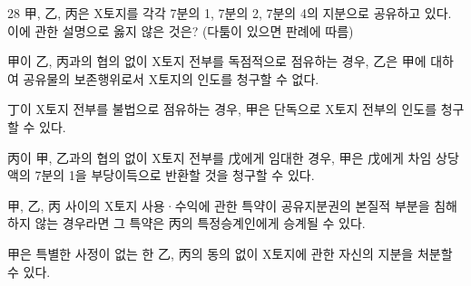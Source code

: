 \begin{question}{28}
甲, 乙, 丙은 X토지를 각각 7분의 1, 7분의 2, 7분의 4의 지분으로 공유하고 있다. 이에 관한 설명으로 옳지 않은 것은? (다툼이 있으면 판례에 따름)
\begin{choices}
  \item 甲이 乙, 丙과의 협의 없이 X토지 전부를 독점적으로 점유하는 경우, 乙은 甲에 대하여 공유물의 보존행위로서 X토지의 인도를 청구할 수 없다.
  \item 丁이 X토지 전부를 불법으로 점유하는 경우, 甲은 단독으로 X토지 전부의 인도를 청구할 수 있다.
  \item 丙이 甲, 乙과의 협의 없이 X토지 전부를 戊에게 임대한 경우, 甲은 戊에게 차임 상당액의 7분의 1을 부당이득으로 반환할 것을 청구할 수 있다.
  \item 甲, 乙, 丙 사이의 X토지 사용·수익에 관한 특약이 공유지분권의 본질적 부분을 침해하지 않는 경우라면 그 특약은 丙의 특정승계인에게 승계될 수 있다.
  \item 甲은 특별한 사정이 없는 한 乙, 丙의 동의 없이 X토지에 관한 자신의 지분을 처분할 수 있다.
\end{choices}
\end{question}
